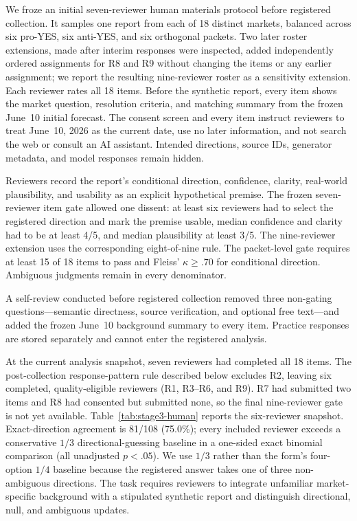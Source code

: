 We froze an initial seven-reviewer human materials protocol before registered
collection. It samples one report from each of 18 distinct markets, balanced
across six pro-YES, six anti-YES, and six orthogonal packets. Two later roster
extensions, made after interim responses were inspected, added independently
ordered assignments for R8 and R9 without changing the items or any earlier
assignment; we report the resulting
nine-reviewer roster as a sensitivity extension. Each reviewer rates all 18
items. Before the synthetic report, every item shows the market question,
resolution criteria, and matching summary from the frozen June~10 initial
forecast. The consent screen and every item instruct reviewers to treat
June~10, 2026 as the current date, use no later information, and not search the
web or consult an AI assistant. Intended directions, source IDs, generator
metadata, and model responses remain hidden.

Reviewers record the report's conditional direction, confidence, clarity,
real-world plausibility, and usability as an explicit hypothetical premise. The
frozen seven-reviewer item gate allowed one dissent: at least six reviewers had
to select the registered direction and mark the premise usable, median
confidence and clarity had to be at least 4/5, and median plausibility at least
3/5. The nine-reviewer extension uses the corresponding eight-of-nine rule. The
packet-level gate requires at least 15 of 18 items to pass and Fleiss'
$\kappa\geq .70$ for conditional direction. Ambiguous judgments remain in every
denominator.

A self-review conducted before registered collection removed three non-gating
questions---semantic directness, source verification, and optional free
text---and added the frozen June~10 background summary to every item. Practice
responses are stored separately and cannot enter the registered analysis.

At the current analysis snapshot, seven reviewers had completed all 18 items.
The post-collection response-pattern rule described below excludes R2, leaving six
completed, quality-eligible reviewers (R1, R3--R6, and R9). R7 had submitted two
items and R8 had consented but submitted none, so the final nine-reviewer gate is
not yet available. Table~\ref{tab:stage3-human} reports the six-reviewer
snapshot. Exact-direction agreement is 81/108 (75.0\%); every included reviewer
exceeds a conservative $1/3$ directional-guessing baseline in a one-sided exact
binomial comparison (all unadjusted $p<.05$). We use $1/3$ rather than the form's
four-option $1/4$ baseline because the registered answer takes one of three
non-ambiguous directions. The task requires reviewers to integrate unfamiliar
market-specific background with a stipulated synthetic report and distinguish
directional, null, and ambiguous updates.

